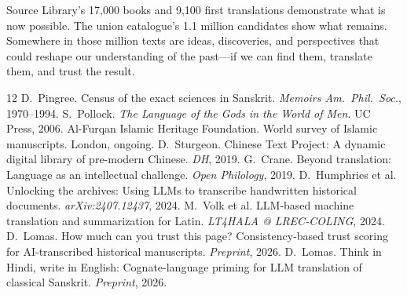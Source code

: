 \documentclass[10pt,twocolumn]{article}
\begin{document}
Source Library's 17,000 books and 9,100 first translations demonstrate what is now possible. The union catalogue's 1.1 million candidates show what remains. Somewhere in those million texts are ideas, discoveries, and perspectives that could reshape our understanding of the past---if we can find them, translate them, and trust the result.

\vspace{-0.5em}
{\scriptsize

\begin{thebibliography}{12}
\setlength{\itemsep}{-1pt}
 D.~Pingree. Census of the exact sciences in Sanskrit. \emph{Memoirs Am.\ Phil.\ Soc.}, 1970--1994.
 S.~Pollock. \emph{The Language of the Gods in the World of Men}. UC Press, 2006.
 Al-Furqan Islamic Heritage Foundation. World survey of Islamic manuscripts. London, ongoing.
 D.~Sturgeon. Chinese Text Project: A dynamic digital library of pre-modern Chinese. \emph{DH}, 2019.
 G.~Crane. Beyond translation: Language as an intellectual challenge. \emph{Open Philology}, 2019.
 D.~Humphries et al. Unlocking the archives: Using LLMs to transcribe handwritten historical documents. \emph{arXiv:2407.12437}, 2024.
 M.~Volk et al. LLM-based machine translation and summarization for Latin. \emph{LT4HALA @ LREC-COLING}, 2024.
 D.~Lomas. How much can you trust this page? Consistency-based trust scoring for AI-transcribed historical manuscripts. \emph{Preprint}, 2026.
 D.~Lomas. Think in Hindi, write in English: Cognate-language priming for LLM translation of classical Sanskrit. \emph{Preprint}, 2026.
\end{thebibliography}
}
\end{document}
